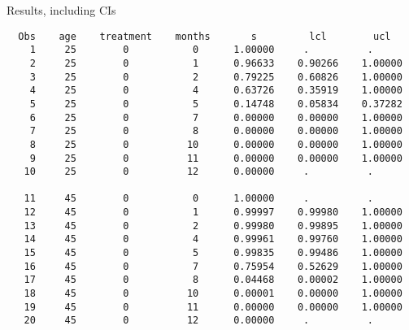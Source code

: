 \documentclass[pdf]{prosper}
\begin{document}
\begin{slide}{Results, including CIs}

{\scriptsize
\begin{verbatim}
  Obs    age    treatment    months       s         lcl        ucl
    1     25        0           0      1.00000     .          .     
    2     25        0           1      0.96633    0.90266    1.00000
    3     25        0           2      0.79225    0.60826    1.00000
    4     25        0           4      0.63726    0.35919    1.00000
    5     25        0           5      0.14748    0.05834    0.37282
    6     25        0           7      0.00000    0.00000    1.00000
    7     25        0           8      0.00000    0.00000    1.00000
    8     25        0          10      0.00000    0.00000    1.00000
    9     25        0          11      0.00000    0.00000    1.00000
   10     25        0          12      0.00000     .          .     
 
   11     45        0           0      1.00000     .          .     
   12     45        0           1      0.99997    0.99980    1.00000
   13     45        0           2      0.99980    0.99895    1.00000
   14     45        0           4      0.99961    0.99760    1.00000
   15     45        0           5      0.99835    0.99486    1.00000
   16     45        0           7      0.75954    0.52629    1.00000
   17     45        0           8      0.04468    0.00002    1.00000
   18     45        0          10      0.00001    0.00000    1.00000
   19     45        0          11      0.00000    0.00000    1.00000
   20     45        0          12      0.00000     .          .     
\end{verbatim}
}
\end{slide}
\end{document}
